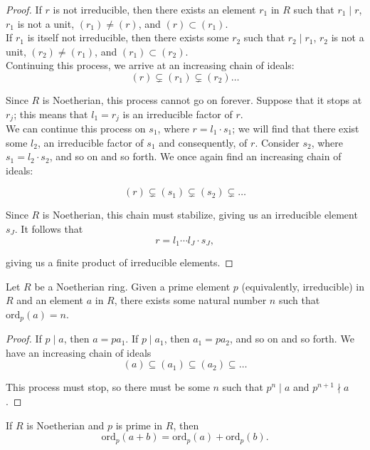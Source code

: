 \documentclass[11pt]{article}
\begin{document}
\begin{proof}
If $r$ is not irreducible, then there exists an element $r_1$ in $R$ such that $r_1 \mid r$, $r_1$ is not a unit, $(r_1) \neq (r)$, and $(r) \subset (r_1)$. \\

If $r_1$ is itself not irreducible, then there exists some $r_2$ such that $r_2 \mid r_1$, $r_2$ is not a unit, $(r_2) \neq (r_1)$, and $(r_1) \subset (r_2)$. \\

Continuing this process, we arrive at an increasing chain of ideals:
\[
    (r) \subsetneq (r_1) \subsetneq (r_2) \dots
\]

Since $R$ is Noetherian, this process cannot go on forever. Suppose that it stops at $r_j$; this means that $l_1 = r_j$ is an irreducible factor of $r$. \\

We can continue this process on $s_1$, where $r = l_1 \cdot s_1$; we will find that there exist some $l_2$, an irreducible factor of $s_1$ and consequently, of $r$. 
Consider $s_2$, where $s_1 = l_2 \cdot s_2$, and so on and so forth. We once again find an increasing chain of ideals:

\[
    (r) \subsetneq (s_1) \subsetneq (s_2) \subsetneq \dots
\]

Since $R$ is Noetherian, this chain must stabilize, giving us an irreducible element $s_J$. It follows that
\[
    r = l_1 \cdots l_J \cdot s_J,
\]

giving us a finite product of irreducible elements.
\end{proof}

\begin{lemma}
Let $R$ be a Noetherian ring. Given a prime element $p$ (equivalently, irreducible) in $R$ and an element $a$ in $R$, there exists some natural number $n$ such that 
$\mathrm{ord}_p(a) = n$. 
\end{lemma}

\begin{proof}
If $p \mid a$, then $a = pa_1$. If $p \mid a_1$, then $a_1 = pa_2$, and so on and so forth. We have an increasing chain of ideals
\[
    (a) \subseteq (a_1) \subseteq (a_2) \subseteq \dots
\]    

This process must stop, so there must be some $n$ such that $p^n \mid a$ and $p^{n+1} \nmid a$.
\end{proof}

\begin{lemma}
If $R$ is Noetherian and $p$ is prime in $R$, then 
\[
    \mathrm{ord}_p(a+b) = \mathrm{ord}_p(a) + \mathrm{ord}_p(b).   
\]
\end{lemma}
\end{document}
